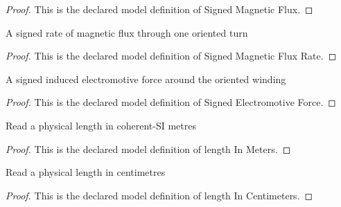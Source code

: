 \begin{proof}
  This is the declared model definition of Signed Magnetic Flux.
\end{proof}
\begin{definition}
  \label{def:physics:phyx-mini-0936:phyxminiproblems-problemphyxmini0936-signedmagneticfluxrate}
  A signed rate of magnetic flux through one oriented turn
\end{definition}
\begin{proof}
  This is the declared model definition of Signed Magnetic Flux Rate.
\end{proof}
\begin{definition}
  \label{def:physics:phyx-mini-0936:phyxminiproblems-problemphyxmini0936-signedelectromotiveforce}
  A signed induced electromotive force around the oriented winding
\end{definition}
\begin{proof}
  This is the declared model definition of Signed Electromotive Force.
\end{proof}
\begin{definition}
  \label{def:physics:phyx-mini-0936:phyxminiproblems-problemphyxmini0936-lengthinmeters}
  Read a physical length in coherent-SI metres
\end{definition}
\begin{proof}
  This is the declared model definition of length In Meters.
\end{proof}
\begin{definition}
  \label{def:physics:phyx-mini-0936:phyxminiproblems-problemphyxmini0936-lengthincentimeters}
  Read a physical length in centimetres
\end{definition}
\begin{proof}
  This is the declared model definition of length In Centimeters.
\end{proof}

